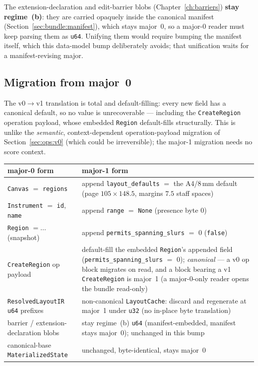 \documentclass[11pt,letterpaper]{report}
\newcommand{\tablenums}[1]{{\addfontfeatures{Numbers={Lining,Tabular}}#1}}
\begin{document}
The extension-declaration and edit-barrier blobs (Chapter~\ref{ch:barriers})
\textbf{stay regime~(b)}: they are carried opaquely inside the canonical
manifest (Section~\ref{sec:bundle:manifest}), which stays major~0, so a
major-0 reader must keep parsing them as \texttt{u64}. Unifying them would
require bumping the manifest itself, which this data-model bump deliberately
avoids; that unification waits for a manifest-revising major.

\subsection{Migration from major~0}
The v0${\to}$v1 translation is total and default-filling: every new field has
a canonical default, so no value is unrecoverable --- including the
\texttt{CreateRegion} operation payload, whose embedded \texttt{Region}
default-fills structurally. This is unlike the \emph{semantic},
context-dependent operation-payload migration of Section~\ref{sec:ops:v0}
(which could be irreversible); the major-1 migration needs no score context.

\begin{center}
\begin{tabular}{p{1.9in} p{3.4in}}
  \toprule
  \textbf{major-0 form} & \textbf{major-1 form} \\
  \midrule
  \texttt{Canvas} $=$ \texttt{regions} &
    append \texttt{layout\_defaults} $=$ the A4/8\,mm default (page
    $105 \times 148.5$, margins $7.5$ staff spaces) \\
  \texttt{Instrument} $=$ \texttt{id}, \texttt{name} &
    append \texttt{range} $=$ \texttt{None} (presence byte \tablenums{0}) \\
  \texttt{Region} $= \ldots$ (snapshot) &
    append \texttt{permits\_spanning\_slurs} $=$ \tablenums{0}
    (\texttt{false}) \\
  \texttt{CreateRegion} op payload &
    default-fill the embedded \texttt{Region}'s appended field
    (\texttt{permits\_spanning\_slurs} $=$ \tablenums{0}); \emph{canonical} ---
    a v0 op block migrates on read, and a block bearing a v1 \texttt{CreateRegion}
    is major~1 (a major-0-only reader opens the bundle read-only) \\
  \texttt{ResolvedLayoutIR} \texttt{u64} prefixes &
    non-canonical \texttt{LayoutCache}: discard and regenerate at major~1
    under \texttt{u32} (no in-place byte translation) \\
  barrier / extension-declaration blobs &
    stay regime~(b) \texttt{u64} (manifest-embedded, manifest stays major~0);
    unchanged in this bump \\
  canonical-base \texttt{MaterializedState} &
    unchanged, byte-identical, stays major~0 \\
  \bottomrule
\end{tabular}
\end{center}
\end{document}
